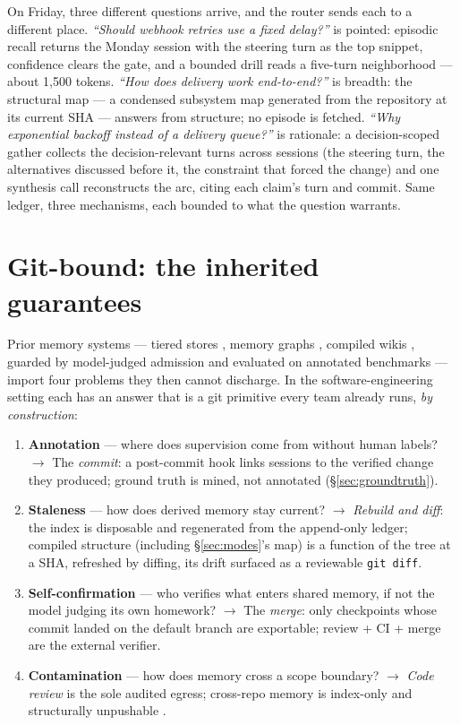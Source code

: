 \documentclass[twocolumn,10pt]{article}
\newcommand{\code}[1]{\texttt{#1}}
\begin{document}
On Friday, three different questions arrive, and the router sends each to a different place. \emph{``Should webhook retries use a fixed delay?''} is pointed: episodic recall returns the Monday session with the steering turn as the top snippet, confidence clears the gate, and a bounded drill reads a five-turn neighborhood --- about 1{,}500 tokens. \emph{``How does delivery work end-to-end?''} is breadth: the structural map --- a condensed subsystem map generated from the repository at its current SHA --- answers from structure; no episode is fetched. \emph{``Why exponential backoff instead of a delivery queue?''} is rationale: a decision-scoped gather collects the decision-relevant turns across sessions (the steering turn, the alternatives discussed before it, the constraint that forced the change) and one synthesis call reconstructs the arc, citing each claim's turn and commit. Same ledger, three mechanisms, each bounded to what the question warrants.

\section{Git-bound: the inherited guarantees}\label{sec:guarantees}

Prior memory systems --- tiered stores \citep{adamem2026}, memory graphs \citep{mragent2026}, compiled wikis \citep{llmwiki2026}, guarded by model-judged admission \citep{edv2026} and evaluated on annotated benchmarks \citep{locomo2024} --- import four problems they then cannot discharge. In the software-engineering setting each has an answer that is a git primitive every team already runs, \emph{by construction}:

\begin{enumerate}\itemsep2pt
  \item \textbf{Annotation} --- where does supervision come from without human labels? $\to$ The \emph{commit}: a post-commit hook links sessions to the verified change they produced; ground truth is mined, not annotated (\S\ref{sec:groundtruth}).
  \item \textbf{Staleness} --- how does derived memory stay current? $\to$ \emph{Rebuild and diff}: the index is disposable and regenerated from the append-only ledger; compiled structure (including \S\ref{sec:modes}'s map) is a function of the tree at a SHA, refreshed by diffing, its drift surfaced as a reviewable \code{git diff}.
  \item \textbf{Self-confirmation} --- who verifies what enters shared memory, if not the model judging its own homework? $\to$ The \emph{merge}: only checkpoints whose commit landed on the default branch are exportable; review + CI + merge are the external verifier.
  \item \textbf{Contamination} --- how does memory cross a scope boundary? $\to$ \emph{Code review} is the sole audited egress; cross-repo memory is index-only and structurally unpushable \citep{memsecurity2026,statecontam2026}.
\end{enumerate}
\end{document}

